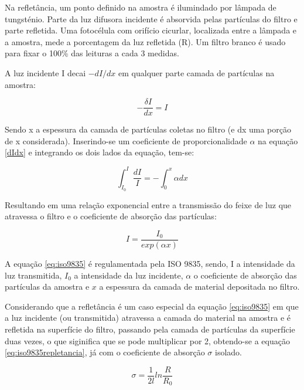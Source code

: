 Na refletância, um ponto definido na amostra é ilumindado por lâmpada de 
tungsténio. Parte da luz difusora incidente é absorvida pelas partículas
do filtro e parte refletida. Uma fotocélula com orifício cicurlar, localizada
entre a lâmpada e a amostra, mede a porcentagem da luz refletida (R).
Um filtro branco é usado para fixar o 100\% das leituras a cada 3 medidas.

A luz incidente I decai $-dI/dx$ em qualquer parte camada de partículas na 
amostra:

\begin{equation}
  \label{eq:dIdx}
  -\frac{\delta I}{dx} = I
\end{equation}

Sendo x a espessura da camada de partículas coletas no filtro (e dx uma porção
de x considerada). 
Inserindo-se um coeficiente de proporcionalidade $\alpha$ na equação \ref{dIdx}
e integrando os dois lados da equação, tem-se:

\begin{equation}
  \int_{I_0}^{I} \frac{dI}{I} = - \int_{0}^{x} \alpha dx
\end{equation}

Resultando em uma relação exponencial entre a transmissão do feixe de luz 
que atravessa o filtro e o coeficiente de absorção das partículas:

\begin{equation}
  \label{eq:iso9835}
  I = \frac{I_0}{exp(\alpha x)}
\end{equation}

A equação \ref{eq:iso9835} é regulamentada pela ISO 9835, sendo, I a intensidade 
da luz transmitida, $I_0$ a intensidade da luz incidente, $\alpha$ o coeficiente
de absorção das partículas da amostra e $x$ a espessura da camada de material
depositada no filtro. 

Considerando que a refletância é um caso especial da equação \ref{eq:iso9835} 
em que a luz incidente (ou transmitida) atravessa a camada do material na 
amostra e é refletida na superfície do filtro, passando pela camada de 
partículas da superfície duas vezes, o que siginifica que se pode
multiplicar  por 2, obtendo-se a equação 
\ref{eq:iso9835repletancia}, já com o coeficiente de absorção $\sigma$
isolado.

\begin{equation}
  \label{eq:iso9835refletancia}
  \sigma = \frac{1}{2l} ln\frac{R}{R_0}
\end{equation}
 

